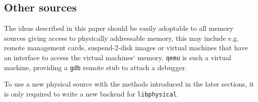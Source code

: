 


\subsection{Other sources}

The ideas described in this paper should be easily adoptable to all memory
sources giving access to physically addressable memory, this may include e.g\@.
remote management cards, suspend-2-disk images or virtual machines that have an
interface to access the virtual machines` memory.  \texttt{qemu} is such a
virtual machine, providing a \texttt{gdb} remote stub to attach a debugger.

To use a new physical source with the methods introduced in the later sections,
it is only required to write a new backend for \texttt{libphysical}.

